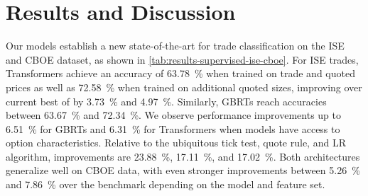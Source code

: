 \section{Results and Discussion}

Our models establish a new state-of-the-art for trade classification on the \gls{ISE} and \gls{CBOE} dataset, as shown in \cref{tab:results-supervised-ise-cboe}. For \gls{ISE} trades, Transformers achieve an accuracy of \SI{63.78}{\percent} when trained on trade and quoted prices as well as \SI{72.58}{\percent} when trained on additional quoted sizes, improving over current best of \textcite[][]{grauerOptionTradeClassification2022} by \SI{3.73}{\percent} and \SI{4.97}{\percent}. Similarly, \glspl{GBRT} reach accuracies between \SI{63.67}{\percent} and \SI{72.34}{\percent}. We observe performance improvements up to \SI{6.51}{\percent} for \glspl{GBRT} and \SI{6.31}{\percent} for Transformers when models have access to option characteristics. Relative to the ubiquitous tick test, quote rule, and \gls{LR} algorithm, improvements are \SI{23.88}{\percent}, \SI{17.11}{\percent}, and \SI{17.02}{\percent}. Both architectures generalize well on \gls{CBOE} data, with even stronger improvements between \SI{5.26}{\percent} and \SI{7.86}{\percent} over the benchmark depending on the model and feature set. 

